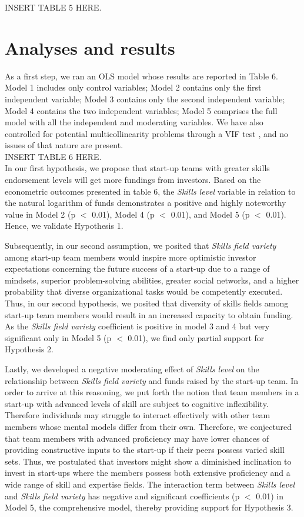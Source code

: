 \documentclass[12pt]{article}
\begin{document}
INSERT TABLE 5 HERE.

\section{Analyses and results}

As a first step, we ran an OLS model whose results are reported in Table 6\label{table6}. Model 1 includes only control variables; Model 2 contains only the first independent variable; Model 3 contains only the second independent variable; Model 4 contains the two independent variables; Model 5 comprises the full model with all the independent and moderating variables. We have also controlled for potential multicollinearity problems through a VIF test \citep{james2013introduction}, and no issues of that nature are present. \\

INSERT TABLE 6 HERE. \\

In our first hypothesis, we propose that start-up teams with greater skills endorsement levels will get more fundings from investors. Based on the econometric outcomes presented in table 6, the \textit{Skills level} variable in relation to the natural logarithm of funds demonstrates a positive and highly noteworthy value in Model 2 (p $<$ 0.01), Model 4 (p $<$ 0.01), and Model 5 (p $<$ 0.01). Hence, we validate Hypothesis 1.

Subsequently, in our second assumption, we posited that \textit{Skills field variety} among start-up team members would inspire more optimistic investor expectations concerning the future success of a start-up due to a range of mindsets, superior problem-solving abilities, greater social networks, and a higher probability that diverse organizational tasks would be competently executed. Thus, in our second hypothesis, we posited that diversity of skills fields among start-up team members would result in an increased capacity to obtain funding. As the \textit{Skills field variety} coefficient is positive in model 3 and 4 but very significant only in Model 5 (p $<$ 0.01), we find only partial support for Hypothesis 2.

Lastly, we developed a negative moderating effect of \textit{Skills level} on the relationship between \textit{Skills field variety} and funds raised by the start-up team. In order to arrive at this reasoning, we put forth the notion that team members in a start-up with advanced levels of skill are subject to cognitive inflexibility. Therefore individuals may struggle to interact effectively with other team members whose mental models differ from their own. Therefore, we conjectured that team members with advanced proficiency may have lower chances of providing constructive inputs to the start-up if their peers possess varied skill sets. Thus, we postulated that investors might show a diminished inclination to invest in start-ups where the members possess both extensive proficiency and a wide range of skill and expertise fields. The interaction term between \textit{Skills level} and \textit{Skills field variety} has negative and significant coefficients (p $<$ 0.01) in Model 5, the comprehensive model, thereby providing support for Hypothesis 3.
\end{document}
